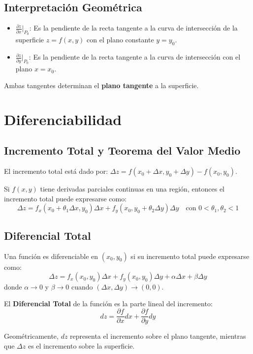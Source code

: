 \documentclass[a4paper,12pt]{article}
\begin{document}
\subsection{Interpretación Geométrica}
\begin{itemize}
    \item $\frac{\partial z}{\partial x}\Big|_{P_0}$: Es la pendiente de la recta tangente a la curva de intersección de la superficie $z = f(x,y)$ con el plano constante $y = y_0$.
    \item $\frac{\partial z}{\partial y}\Big|_{P_0}$: Es la pendiente de la recta tangente a la curva de intersección con el plano $x = x_0$.
\end{itemize}
Ambas tangentes determinan el \textbf{plano tangente} a la superficie.

\section{Diferenciabilidad}
\subsection{Incremento Total y Teorema del Valor Medio}
El incremento total está dado por: $\Delta z = f(x_0+\Delta x, y_0+\Delta y) - f(x_0,y_0)$.

\begin{tcolorbox}[title=Teorema del Valor Medio,colback=blue!5!white,colframe=blue!75!black]
    Si $f(x,y)$ tiene derivadas parciales continuas en una región, entonces el incremento total puede expresarse como:
    $$ \Delta z = f_x(x_0+\theta_1\Delta x, y_0)\Delta x + f_y(x_0, y_0+\theta_2\Delta y)\Delta y \quad \text{con } 0 < \theta_1, \theta_2 < 1 $$
\end{tcolorbox}

\subsection{Diferencial Total}
Una función es diferenciable en $(x_0,y_0)$ si su incremento total puede expresarse como:
$$ \Delta z = f_x(x_0,y_0)\Delta x + f_y(x_0,y_0)\Delta y + \alpha\Delta x + \beta\Delta y $$
donde $\alpha \to 0$ y $\beta \to 0$ cuando $(\Delta x, \Delta y) \to (0,0)$.

El \textbf{Diferencial Total} de la función es la parte lineal del incremento:
$$ dz = \frac{\partial f}{\partial x} dx + \frac{\partial f}{\partial y} dy $$

Geométricamente, $dz$ representa el incremento sobre el plano tangente, mientras que $\Delta z$ es el incremento sobre la superficie.
\end{document}
